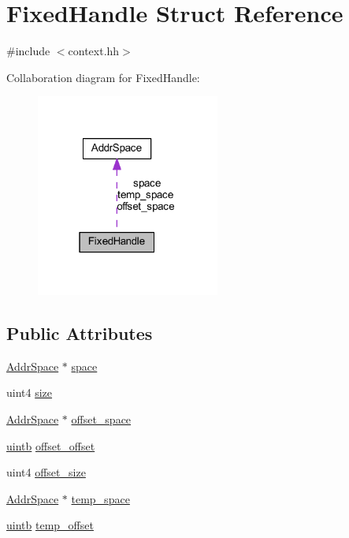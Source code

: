 \hypertarget{struct_fixed_handle}{}\section{Fixed\+Handle Struct Reference}
\label{struct_fixed_handle}


{\ttfamily \#include $<$context.\+hh$>$}



Collaboration diagram for Fixed\+Handle\+:
\nopagebreak
\begin{figure}[H]
\begin{center}
\leavevmode
\includegraphics[width=171pt]{struct_fixed_handle__coll__graph}
\end{center}
\end{figure}
\subsection*{Public Attributes}
\begin{DoxyCompactItemize}
\item 
\mbox{\hyperlink{class_addr_space}{Addr\+Space}} $\ast$ \mbox{\hyperlink{struct_fixed_handle_a586744314e01538098e1cb2bfbc501da}{space}}
\item 
uint4 \mbox{\hyperlink{struct_fixed_handle_aea689738eae3a5efef95baa06e147cb9}{size}}
\item 
\mbox{\hyperlink{class_addr_space}{Addr\+Space}} $\ast$ \mbox{\hyperlink{struct_fixed_handle_a9c2922ee2c0bc37b8fbc2005120a01d9}{offset\+\_\+space}}
\item 
\mbox{\hyperlink{types_8h_a2db313c5d32a12b01d26ac9b3bca178f}{uintb}} \mbox{\hyperlink{struct_fixed_handle_a991cdc17d1977e3ad1c158441cfece03}{offset\+\_\+offset}}
\item 
uint4 \mbox{\hyperlink{struct_fixed_handle_a9dd13fb6e4c6658c00a4048c9e2c8951}{offset\+\_\+size}}
\item 
\mbox{\hyperlink{class_addr_space}{Addr\+Space}} $\ast$ \mbox{\hyperlink{struct_fixed_handle_ac599fe9a8fe7b919e1ea86398289d17c}{temp\+\_\+space}}
\item 
\mbox{\hyperlink{types_8h_a2db313c5d32a12b01d26ac9b3bca178f}{uintb}} \mbox{\hyperlink{struct_fixed_handle_a5ff9452b3c33b06ac8c9fe7c85b76496}{temp\+\_\+offset}}
\end{DoxyCompactItemize}


